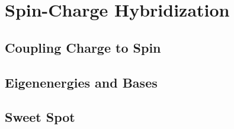 \section{Spin-Charge Hybridization}\label{SEC:single_hybrid}

\subsection{Coupling Charge to Spin}
\subsection{Eigenenergies and Bases}
\subsection{Sweet Spot}